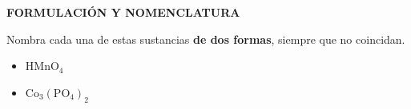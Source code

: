 \documentclass[a4paper,addpoints,14pt]{exam}
\newcommand*\chem[1]{\ensuremath{\mathrm{#1}}}
\newcommand{\halmos}{\vspace*{-4mm}
	
					\begin{flushright}
						\rule{1mm}{2.5mm} 
					\end{flushright}\vspace*{-4mm}
						
					  }
\renewcommand{\qed}{\halmos}
\begin{document}
\begin{questions}
%
%
%
%
%

\vspace*{3ex}



\begin{formulacion}
\textbf{FORMULACIÓN Y NOMENCLATURA}
\end{formulacion}


\begin{question}[4]
	Nombra cada una de estas sustancias \textbf{de dos formas}, siempre que no coincidan. 
	\begin{itemize}
		\item $\chem{HMnO_4}$
		\vspace{50pt}
		
				
		\item $\chem{Co_3(PO_4)_2}$
		\vspace{50pt}
		

\end{itemize}
\end{question}
\end{questions}
\end{document}
